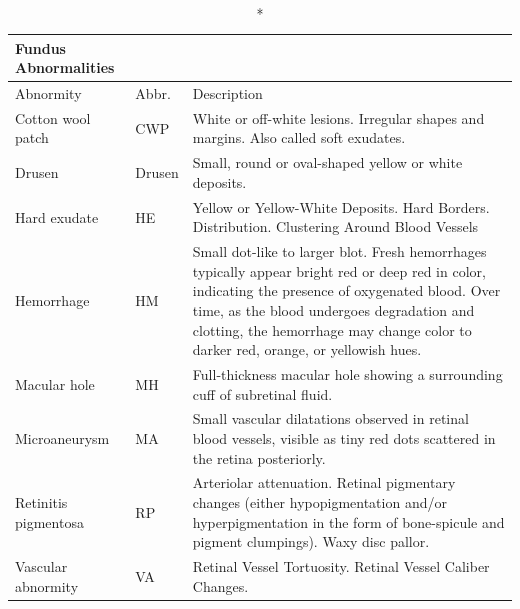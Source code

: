\documentclass{article}
\begin{document}
	{
		\fontsize{9}{12}\selectfont
		{
			\begin{longtable}{llp{11.2cm}}
				\caption*{Fundus Abnormalities}
				\label{tb:fundus-ab}\\
				\toprule
				Abnormity&Abbr.&Description\\
				\toprule
				
				Cotton wool patch
				& CWP
				& White or off-white lesions. Irregular shapes and margins. Also called soft exudates. \\
				
				Drusen
				& Drusen
				& Small, round or oval-shaped yellow or white deposits.\\
				
				Hard exudate
				& HE
				& Yellow or Yellow-White Deposits. Hard Borders. Distribution. Clustering Around Blood Vessels\\
				
				Hemorrhage
				& HM
				& Small dot-like to larger blot. Fresh hemorrhages typically appear bright red or deep red in color, indicating the presence of oxygenated blood. Over time, as the blood undergoes degradation and clotting, the hemorrhage may change color to darker red, orange, or yellowish hues.\\
				
				Macular hole
				& MH
				& Full-thickness macular hole showing a surrounding cuff of subretinal fluid.\\
				
				Microaneurysm
				& MA
				& Small vascular dilatations observed in retinal blood vessels, visible as tiny red dots scattered in the retina posteriorly.\\

				Retinitis pigmentosa
				& RP
				& Arteriolar attenuation. Retinal pigmentary changes (either hypopigmentation and/or hyperpigmentation in the form of bone-spicule and pigment clumpings). Waxy disc pallor.\\

				Vascular abnormity
				& VA
				& Retinal Vessel Tortuosity. Retinal Vessel Caliber Changes. \\
				
				\bottomrule
			\end{longtable}
		}
	}
	
\end{document}
